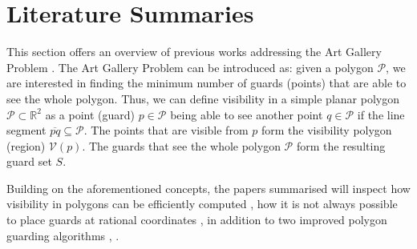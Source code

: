 \section{Literature Summaries}
This section offers an overview of previous works addressing the Art Gallery Problem \cite{o1987art}. The Art Gallery Problem \cite{o1987art} can be introduced as: given a polygon $\mathcal P$, we are interested in finding the minimum number of guards (points) that are able to see the whole polygon. Thus, we can define visibility in a simple planar polygon $\mathcal P \subset \mathbb R^2$ as a point (guard) $p \in \mathcal P$ being able to see another point $q \in \mathcal P$ if the line segment $\overline{pq} \subseteq \mathcal P$. The points that are visible from $p$ form the visibility polygon (region) $\mathcal V(p)$. The guards that see the whole polygon $\mathcal P$ form the resulting guard set $S$.

Building on the aforementioned concepts, the papers summarised will inspect how visibility in polygons can be efficiently computed \cite{DBLP:journals/corr/BungiuHHHK14}, how it is not always possible to place guards at rational coordinates \cite{abrahamsen2021art}, in addition to two improved polygon guarding algorithms \cite{maleki2022implementation}, \cite{DBLP:journals/corr/abs-2007-06920}.





\newpage

